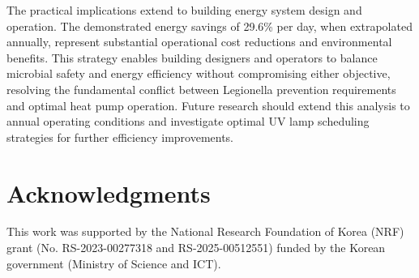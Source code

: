 \documentclass[letterpaper,10pt]{article}
\begin{document}
The practical implications extend to building energy system design and operation. The demonstrated energy savings of 29.6\% per day, when extrapolated annually, represent substantial operational cost reductions and environmental benefits. This strategy enables building designers and operators to balance microbial safety and energy efficiency without compromising either objective, resolving the fundamental conflict between Legionella prevention requirements and optimal heat pump operation. Future research should extend this analysis to annual operating conditions and investigate optimal UV lamp scheduling strategies for further efficiency improvements.

\section*{Acknowledgments}

This work was supported by the National Research Foundation of Korea (NRF) grant (No. RS-2023-00277318 and RS-2025-00512551) funded by the Korean government (Ministry of Science and ICT).



\end{document}
